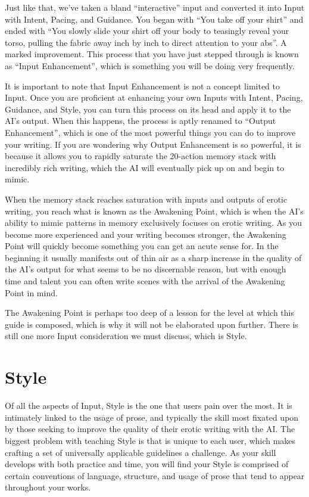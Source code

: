 \documentclass[Coomer-main.tex]{subfiles}
\begin{document}
Just like that, we’ve taken a bland “interactive” input and converted it into Input with Intent, Pacing, and Guidance.
You began with “You take off your shirt” and ended with “You slowly slide your shirt off your body to teasingly reveal your torso, pulling the fabric away inch by inch to direct attention to your abs”.
A marked improvement.
This process that you have just stepped through is known as “Input Enhancement”, which is something you will be doing very frequently.

It is important to note that Input Enhancement is not a concept limited to Input.
Once you are proficient at enhancing your own Inputs with Intent, Pacing, Guidance, and Style, you can turn this process on its head and apply it to the AI’s output.
When this happens, the process is aptly renamed to “Output Enhancement”, which is one of the most powerful things you can do to improve your writing.
If you are wondering why Output Enhancement is so powerful, it is because it allows you to rapidly saturate the 20-action memory stack with incredibly rich writing, which the AI will eventually pick up on and begin to mimic.

When the memory stack reaches saturation with inputs and outputs of erotic writing, you reach what is known as the Awakening Point, which is when the AI’s ability to mimic patterns in memory exclusively focuses on erotic writing.
As you become more experienced and your writing becomes stronger, the Awakening Point will quickly become something you can get an acute sense for.
In the beginning it usually manifests out of thin air as a sharp increase in the quality of the AI’s output for what seems to be no discernable reason, but with enough time and talent you can often write scenes with the arrival of the Awakening Point in mind.

The Awakening Point is perhaps too deep of a lesson for the level at which this guide is composed, which is why it will not be elaborated upon further.
There is still one more Input consideration we must discuss, which is Style.

\chapter{Style}
\label{ch:style}

Of all the aspects of Input, Style is the one that users pain over the most.
It is intimately linked to the usage of prose, and typically the skill most fixated upon by those seeking to improve the quality of their erotic writing with the AI.
The biggest problem with teaching Style is that is unique to each user, which makes crafting a set of universally applicable guidelines a challenge.
As your skill develops with both practice and time, you will find your Style is comprised of certain conventions of language, structure, and usage of prose that tend to appear throughout your works.
\end{document}
